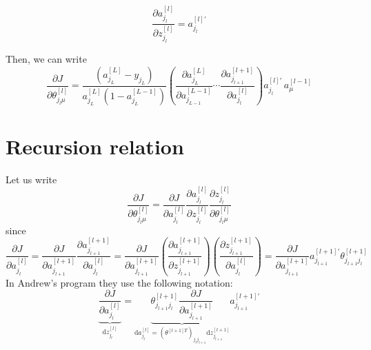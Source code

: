 \documentclass[a4paper,11pt]{article}
\newcommand{\dd}{\text{d}}
\newcommand{\na}[2]{a_{#1}^{[#2]}}
\newcommand{\nz}[2]{z_{#1}^{[#2]}}
\newcommand{\nt}[3]{\theta_{#1 #2}^{[#3]}}
\begin{document}
\begin{equation}
	\frac{\partial \na{j_{l}}{l}   }{\partial \nz{j_{l}}{l}   } =  a_{j_{l}}^{[l]'}
\end{equation} 

Then, we can write
\begin{equation}
    \frac{\partial J }{\partial  \nt{j_l}{\mu}{l}  } =
    \frac{(\na{j_L}{L} -y_{j_L})}{\na{j_L}{L} (1-\na{j_L}{L-1} )} 
    \left(
    \frac{\partial \na{j_L}{L}  }{\partial \na{j_{L-1}}{L-1}  }
    \cdots\frac{\partial \na{j_{l+1}}{l+1}   }{\partial \na{j_{l}}{l}   } 
    \right) a_{j_{l}}^{[l]'} 
   \, \na{\mu}{l-1} 
\end{equation}

\section{Recursion relation}
Let us write
\begin{equation}
    \frac{\partial J }{\partial  \nt{j_l}{\mu}{l}  } 
   =\frac{\partial J  }{\partial \na{j_l}{l}   }
    \frac{\partial \na{j_l}{l}   }{\partial \nz{j_l}{l}   }
    \frac{\partial \nz{j_l}{l} }
        {\partial \nt{j_l}{\mu}{l}  }
\end{equation}
since 
\begin{equation}
\frac{\partial J  }{\partial \na{j_l}{l}   }
= \frac{\partial J  }{\partial \na{j_{l+1}}{l+1}   } \frac{\partial \na{j_{l+1}}{l+1}   }{ \partial \na{j_{l}}{l}  }
= \frac{\partial J  }{\partial \na{j_{l+1}}{l+1}   } 
  \left( \frac{\partial \na{j_{l+1}}{l+1}}   {\partial \nz{j_{l+1}}{l+1}  }\right)
   \left( \frac{\partial \nz{j_{l+1}}{l+1} }   {\partial \na{j_{l}}{l}  }\right)
=\frac{\partial J  }{\partial \na{j_{l+1}}{l+1}   } a^{[l+1]'}_{j_{l+1} }  \nt{j_{l+1}}{j_{l}}{l+1}
\end{equation}
In Andrew's program they use the following notation:
\begin{equation}
\underbrace{\frac{\partial J  }{\partial \na{j_l}{l}   }}_{\dd z_{j_l}^{[l]} }
=\underbrace{\nt{j_{l+1}}{j_{l}}{l+1} \frac{\partial J  }{\partial \na{j_{l+1}}{l+1}   }   }
_{ \dd a_{j_{l}}^{[l]}  =  (\theta^{[l+1]T} )_{j_{l} j_{l+1}}   \dd z_{j_{l+1}}^{[l+1]}  } 
a^{[l+1]'}_{j_{l+1} }
\end{equation}

\end{document}
